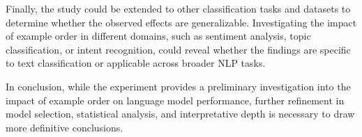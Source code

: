 \documentclass{article}
\begin{document}
Finally, the study could be extended to other classification tasks and datasets to determine whether the observed effects are generalizable. Investigating the impact of example order in different domains, such as sentiment analysis, topic classification, or intent recognition, could reveal whether the findings are specific to text classification or applicable across broader NLP tasks.

In conclusion, while the experiment provides a preliminary investigation into the impact of example order on language model performance, further refinement in model selection, statistical analysis, and interpretative depth is necessary to draw more definitive conclusions.
\end{document}
